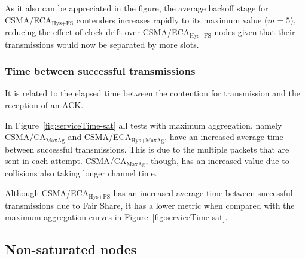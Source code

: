 	As it also can be appreciated in the figure, the average backoff stage for CSMA/ECA$_{\text{Hys+FS}}$ contenders increases rapidly to its maximum value ($m=5$), reducing the effect of clock drift over CSMA/ECA$_{\text{Hys+FS}}$ nodes given that their transmissions would now be separated by more slots.\\
	
	\subsubsection{Time between successful transmissions}\label{timeBetweenSxTx}
	It is related to the elapsed time between the contention for transmission and the reception of an ACK.

	
	In Figure~\ref{fig:serviceTime-sat} all tests with maximum aggregation, namely CSMA/CA$_{\text{MaxAg}}$ and CSMA/ECA$_{\text{Hys+MaxAg}}$, have an increased average time between successful transmissions. This is due to the multiple packets that are sent in each attempt. CSMA/CA$_{\text{MaxAg}}$, though, has an increased value due to collisions also taking longer channel time.
	
	Although CSMA/ECA$_{\text{Hys+FS}}$ has an increased average time between successful transmissions due to Fair Share, it has a lower metric when compared with the maximum aggregation curves in Figure~\ref{fig:serviceTime-sat}.




	\subsection{Non-saturated nodes}\label{resultsUnsaturated}
	
